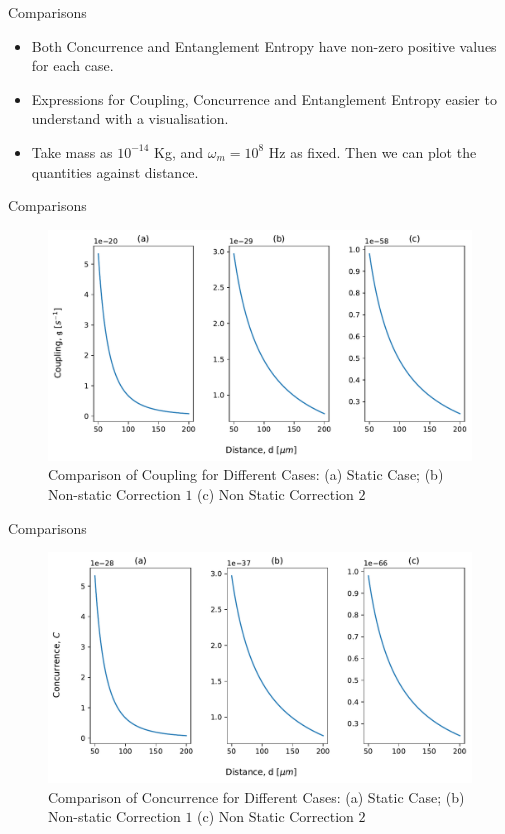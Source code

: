 \documentclass[12pt,aspectratio=1610]{beamer}
\begin{document}
\begin{frame}{Comparisons}
    \begin{itemize}
        \item Both Concurrence and Entanglement Entropy have non-zero positive values for each case.
        \item Expressions for Coupling, Concurrence and Entanglement Entropy easier to understand with a visualisation.
        \item Take mass as $10^{-14}$ Kg, and $\omega_m = 10^8$ Hz as fixed. Then we can plot the quantities against distance.
    \end{itemize}
\end{frame}

\begin{frame}{Comparisons}
    \begin{figure}
            \centering
            \includegraphics[width=12cm]{Coupling.pdf}
            \captionsetup{labelformat=empty}
            \caption{\footnotesize{Comparison of Coupling for Different Cases:  (a) Static Case; (b) Non-static Correction $1$ (c) Non Static Correction $2$}}
            \label{fig:Coupling}
        \end{figure}
\end{frame}

\begin{frame}{Comparisons}
    \begin{figure}
            \centering
            \includegraphics[width=12cm]{ConcCases.pdf}
            \captionsetup{labelformat=empty}
            \caption{\footnotesize{Comparison of Concurrence for Different Cases:  (a) Static Case; (b) Non-static Correction $1$ (c) Non Static Correction $2$}}
            \label{fig:ConcCases}
        \end{figure}
\end{frame}
\end{document}
